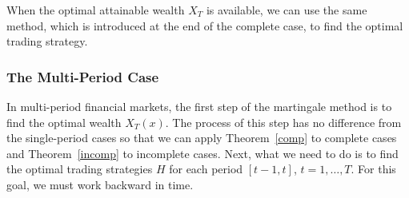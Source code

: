 \documentclass[a4paper]{article}
\newtheorem{exa}{Example}[section]
\theoremstyle{definition}
\numberwithin{equation}{section}
\begin{document}
When the optimal attainable wealth $X_T$ is available, we can use the same method, which is introduced at the end of the complete case, to find the optimal trading strategy.

\subsubsection{The Multi-Period Case}

In multi-period financial markets, the first step of the martingale method is to find the optimal wealth $X_T(x)$. The process of this step has no difference from the single-period cases so that we can apply Theorem~\ref{comp} to complete cases and Theorem~\ref{incomp} to incomplete cases.
Next, what we need to do is to find the optimal trading strategies $H$ for each period $[t-1,t]$, $t=1,\dots,T$. For this goal, we must work backward in time.
\end{document}
